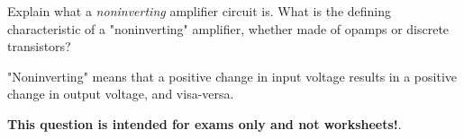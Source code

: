 

Explain what a {\it noninverting} amplifier circuit is.  What is the defining characteristic of a "noninverting" amplifier, whether made of opamps or discrete transistors?







"Noninverting" means that a positive change in input voltage results in a positive change in output voltage, and visa-versa.







{\bf This question is intended for exams only and not worksheets!}.




